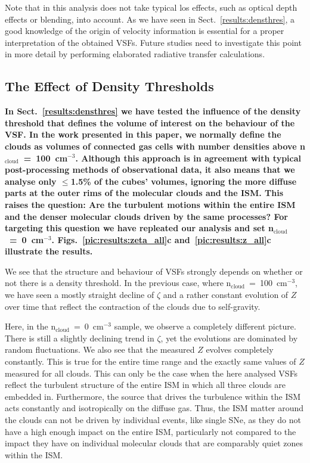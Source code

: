 Note that in this analysis does not take typical los effects, such as optical depth effects or blending, into account. 
As we have seen in Sect.~\ref{results:densthres}, a good knowledge of the origin of velocity information is essential for a proper interpretation of the obtained VSFs.
Future studies need to investigate this point in more detail by performing elaborated radiative transfer calculations. 



\subsection{The Effect of Density Thresholds}\label{discussion:densthres}

\textbf{In Sect.~\ref{results:densthres} we have tested the influence of the density threshold that defines the volume of interest on the behaviour of the VSF.
In the work presented in this paper, we normally define the clouds as volumes of connected gas cells with number densities above n$_\mathrm{cloud}$~=~100~cm$^{-3}$.
Although this approach is in agreement with typical post-processing methods of observational data, it also means that we analyse only $\leq$1.5\% of the cubes' volumes, ignoring the more diffuse parts at the outer rims of the molecular clouds and the ISM.
This raises the question: Are the turbulent motions within the entire ISM and the denser molecular clouds driven by the same processes?
For targeting this question we have repleated our analysis and set n$_\mathrm{cloud}$~=~0~cm$^{-3}$.
Figs.~\ref{pic:results:zeta_all}c and~\ref{pic:results:z_all}c illustrate the results.
}

We see that the structure and behaviour of VSFs strongly depends on whether or not there is a density threshold. 
In the previous case, where n$_\mathrm{cloud}$~=~100~cm$^{-3}$, we have seen a mostly straight decline of $\zeta$ and a rather constant evolution of $Z$ over time that reflect the contraction of the clouds due to self-gravity.

Here, in the n$_\mathrm{cloud}$~=~0~cm$^{-3}$ sample, we observe a completely different picture.
There is still a slightly declining trend in $\zeta$, yet the evolutions are dominated by random fluctuations.
We also see that the measured $Z$ evolves completely constantly.
This is true for the entire time range and the exactly same values of $Z$ measured for all clouds.
This can only be the case when the here analysed VSFs reflect the turbulent structure of the entire ISM in which all three clouds are embedded in.
Furthermore, the source that drives the turbulence within the ISM acts constantly and isotropically on the diffuse gas.
Thus, the ISM matter around the clouds can not be driven by individual events, like single SNe, as they do not have a high enough impact on the entire ISM, particularly not compared to the impact they have on individual molecular clouds that are comparably quiet zones within the ISM.

